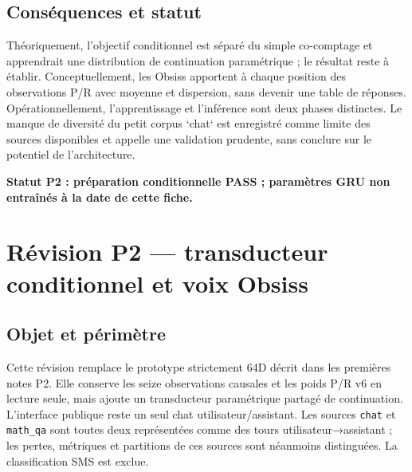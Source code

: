 \documentclass[11pt,a4paper]{report}
\begin{document}
\section{Conséquences et statut}
Théoriquement, l'objectif conditionnel est séparé du simple co-comptage et apprendrait une distribution de continuation paramétrique ; le résultat reste à établir. Conceptuellement, les Obsiss apportent à chaque position des observations P/R avec moyenne et dispersion, sans devenir une table de réponses. Opérationnellement, l'apprentissage et l'inférence sont deux phases distinctes. Le manque de diversité du petit corpus `chat` est enregistré comme limite des sources disponibles et appelle une validation prudente, sans conclure sur le potentiel de l'architecture.

\begin{center}
\textbf{Statut P2 : préparation conditionnelle PASS ; paramètres GRU non entraînés à la date de cette fiche.}
\end{center}


\chapter{Révision P2 — transducteur conditionnel et voix Obsiss}
\section{Objet et périmètre}
Cette révision remplace le prototype strictement 64D décrit dans les premières notes P2. Elle conserve les seize observations causales et les poids P/R v6 en lecture seule, mais ajoute un transducteur paramétrique partagé de continuation. L'interface publique reste un seul chat utilisateur/assistant. Les sources \texttt{chat} et \texttt{math\_qa} sont toutes deux représentées comme des tours utilisateur→assistant ; les pertes, métriques et partitions de ces sources sont néanmoins distinguées. La classification SMS est exclue.
\end{document}
